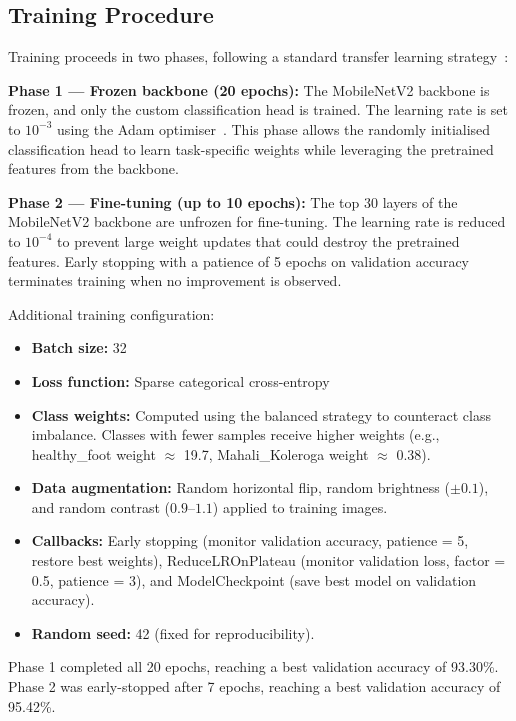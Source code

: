 \documentclass[conference]{IEEEtran}
\begin{document}
\subsection{Training Procedure}

Training proceeds in two phases, following a standard transfer learning strategy~\cite{pan2010}:

\textbf{Phase 1 --- Frozen backbone (20 epochs):} The MobileNetV2 backbone is frozen, and only the custom classification head is trained. The learning rate is set to $10^{-3}$ using the Adam optimiser~\cite{kingma2015}. This phase allows the randomly initialised classification head to learn task-specific weights while leveraging the pretrained features from the backbone.

\textbf{Phase 2 --- Fine-tuning (up to 10 epochs):} The top 30 layers of the MobileNetV2 backbone are unfrozen for fine-tuning. The learning rate is reduced to $10^{-4}$ to prevent large weight updates that could destroy the pretrained features. Early stopping with a patience of 5 epochs on validation accuracy terminates training when no improvement is observed.

Additional training configuration:
\begin{itemize}
    \item \textbf{Batch size:} 32
    \item \textbf{Loss function:} Sparse categorical cross-entropy
    \item \textbf{Class weights:} Computed using the balanced strategy to counteract class imbalance. Classes with fewer samples receive higher weights (e.g., healthy\_foot weight $\approx$ 19.7, Mahali\_Koleroga weight $\approx$ 0.38).
    \item \textbf{Data augmentation:} Random horizontal flip, random brightness ($\pm 0.1$), and random contrast ($0.9$--$1.1$) applied to training images.
    \item \textbf{Callbacks:} Early stopping (monitor validation accuracy, patience = 5, restore best weights), ReduceLROnPlateau (monitor validation loss, factor = 0.5, patience = 3), and ModelCheckpoint (save best model on validation accuracy).
    \item \textbf{Random seed:} 42 (fixed for reproducibility).
\end{itemize}

Phase 1 completed all 20 epochs, reaching a best validation accuracy of 93.30\%. Phase 2 was early-stopped after 7 epochs, reaching a best validation accuracy of 95.42\%.
\end{document}
